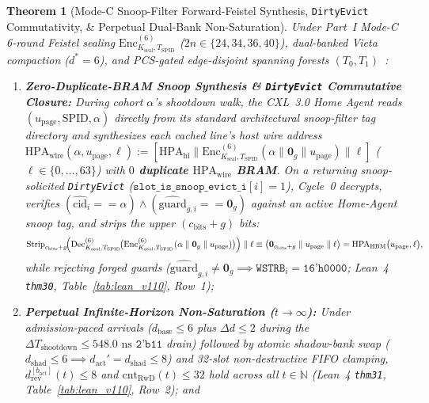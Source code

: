 \documentclass[10pt,twocolumn]{article}
\theoremstyle{spectralthm}
\newtheorem{theorem}{Theorem}[section]
\begin{document}
\begin{theorem}[Mode-C Snoop-Filter Forward-Feistel Synthesis, \texttt{DirtyEvict} Commutativity, \& Perpetual Dual-Bank Non-Saturation]
\label{thm:bijective_snoop_compaction}
Under Part~I Mode-C 6-round Feistel sealing $\mathrm{Enc}_{K_{\mathrm{seal}}, T_{\mathrm{SPID}}}^{(6)}$ ($2n \in \{24,34,36,40\}$), dual-banked Vieta compaction ($d^* = 6$), and PCS-gated edge-disjoint spanning forests $(T_0, T_1)$~\cite{tutte1961problem,nashwilliams1961edge,ucie2025spec30}:
\begin{enumerate}
  \item[(i)] \textbf{Zero-Duplicate-BRAM Snoop Synthesis \& \texttt{DirtyEvict} Commutative Closure:} During cohort $\alpha$'s shootdown walk, the CXL~3.0 Home Agent reads $(u_{\mathrm{page}}, \mathrm{SPID}, \alpha)$ directly from its standard architectural snoop-filter tag directory and synthesizes each cached line's host wire address $\mathrm{HPA}_{\mathrm{wire}}(\alpha, u_{\mathrm{page}}, \ell) := [\mathrm{HPA}_{\mathrm{hi}} \parallel \mathrm{Enc}_{K_{\mathrm{seal}}, T_{\mathrm{SPID}}}^{(6)}(\alpha \parallel \mathbf{0}_g \parallel u_{\mathrm{page}}) \parallel \ell]$ ($\ell \in \{0,\ldots,63\}$) with \textbf{$0$ duplicate $\mathrm{HPA}_{\mathrm{wire}}$ BRAM}. On a returning snoop-solicited \texttt{DirtyEvict} ($\texttt{slot\_is\_snoop\_evict\_i}[i] = 1$), Cycle~0 decrypts, verifies $(\widehat{\mathrm{cid}}_i == \alpha) \wedge (\widehat{\mathrm{guard}}_{g,i} == \mathbf{0}_g)$ against an active Home-Agent snoop tag, and strips the upper $(c_{\mathrm{bits}}+g)$ bits:
  \begin{equation}
  \label{eq:snoop_commute}
  \mathrm{Strip}_{c_{\mathrm{bits}}+g}\!\Bigl(\mathrm{Dec}_{K_{\mathrm{seal}}, T_{\mathrm{SPID}}}^{(6)}\!\bigl(\mathrm{Enc}_{K_{\mathrm{seal}}, T_{\mathrm{SPID}}}^{(6)}(\alpha \parallel \mathbf{0}_g \parallel u_{\mathrm{page}})\bigr)\Bigr) \parallel \ell
  \equiv \bigl(\mathbf{0}_{c_{\mathrm{bits}}+g} \parallel u_{\mathrm{page}} \parallel \ell\bigr)
  = \mathrm{HPA}_{\mathrm{HBM}}\bigl(u_{\mathrm{page}}, \ell\bigr),
  \end{equation}
  while rejecting forged guards ($\widehat{\mathrm{guard}}_{g,i} \neq \mathbf{0}_g \implies \texttt{WSTRB}_i = \texttt{16'h0000}$; Lean~4 \texttt{thm30}, Table~\ref{tab:lean_v110}, Row~1);
  \item[(ii)] \textbf{Perpetual Infinite-Horizon Non-Saturation ($t \to \infty$):} Under admission-paced arrivals ($d_{\mathrm{base}} \le 6$ plus $\Delta d \le 2$ during the $\Delta T_{\mathrm{shootdown}} \le 548.0\text{~ns}$ $\texttt{2'b11}$ drain) followed by atomic shadow-bank swap ($d_{\mathrm{shad}} \le 6 \implies d_{\mathrm{act}}' = d_{\mathrm{shad}} \le 8$) and 32-slot non-destructive FIFO clamping, $d_{\mathrm{rev}}^{[b_{\mathrm{act}}]}(t) \le 8$ and $\mathrm{cnt}_{\mathrm{RwD}}(t) \le 32$ hold across all $t \in \mathbb{N}$ (Lean~4 \texttt{thm31}, Table~\ref{tab:lean_v110}, Row~2); and

\end{enumerate}
\end{theorem}
\end{document}
